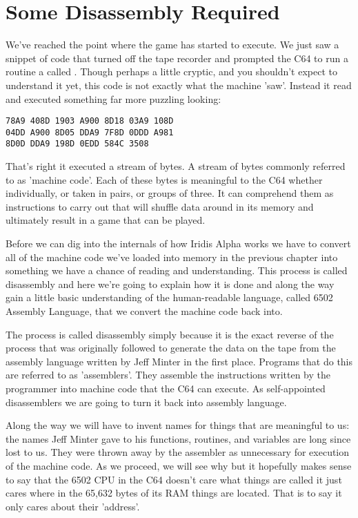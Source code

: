 \chapter{Some Disassembly Required} 
\lstset{style=6502Style}

We've reached the point where the game has started to execute. We just saw a snippet of code that turned off the
tape recorder and prompted the C64 to run a routine a called . Though perhaps a little
cryptic, and you shouldn't expect to understand it yet, this code is not exactly what the machine 'saw'. Instead it read and executed something far more puzzling looking:


\begin{lstlisting}[caption=The first piece of machine code that is executed in Iridis Alpha.]
78A9 408D 1903 A900 8D18 03A9 108D
04DD A900 8D05 DDA9 7F8D 0DDD A981
8D0D DDA9 198D 0EDD 584C 3508 
\end{lstlisting}

That's right it executed a stream of bytes. A stream of bytes commonly referred to as 'machine code'. Each of these
bytes is meaningful to the C64 whether individually, or taken in pairs, or groups of three. It can comprehend them
as instructions to carry out that will shuffle data around in its memory and ultimately result in a game that
can be played.

Before we can dig into the internals of how Iridis Alpha works we have to convert all of the machine code we've
loaded into memory in the previous chapter into something we have a chance of reading and understanding. This
process is called disassembly and here we're going to explain how it is done and along the way gain a little
basic understanding of the human-readable language, called 6502 Assembly Language, that we convert the machine
code back into.

The process is called disassembly simply because it is the exact reverse of the process that was originally followed
to generate the data on the tape from the assembly language written by Jeff Minter in the first place. Programs that
do this are referred to as 'assemblers'. They assemble the instructions written by the programmer into machine code
that the C64 can execute. As self-appointed disassemblers we are going to turn it back into assembly language.

Along the way we will have to invent names for things that are meaningful to us: the names Jeff Minter gave to his
functions, routines, and variables are long since lost to us. They were thrown away by the assembler as unnecessary
for execution of the machine code. As we proceed, we will see why but it hopefully makes sense to say that the
6502 CPU in the C64 doesn't care what things are called it just cares where in the 65,632 bytes of its RAM things
are located. That is to say it only cares about their 'address'.


